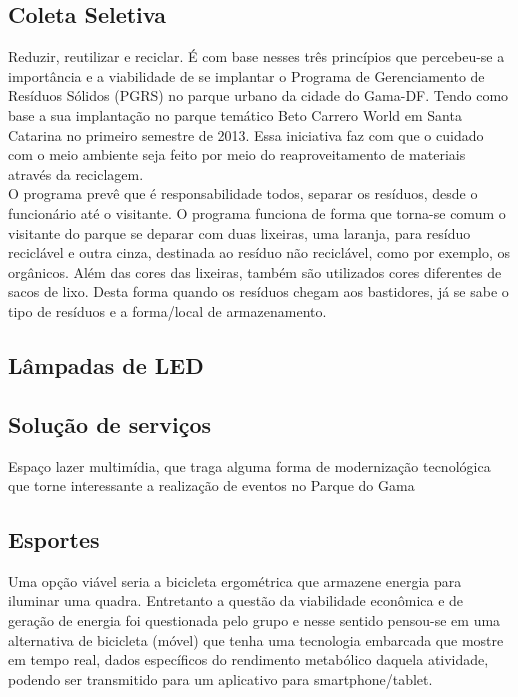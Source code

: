 \subsection{Coleta Seletiva}

Reduzir, reutilizar e reciclar. \'E com base nesses tr\^es princ\'ipios que percebeu-se a import\^ancia e a viabilidade de se implantar o Programa de Gerenciamento de Res\'iduos S\'olidos (PGRS) no parque urbano da cidade do Gama-DF. Tendo como base a sua implanta\c{c}\~ao no parque tem\'atico Beto Carrero World em Santa Catarina no primeiro semestre de 2013. Essa iniciativa faz com que o cuidado com o meio ambiente seja feito por meio do reaproveitamento de materiais atrav\'es da reciclagem. \\
O programa prev\^e que \'e responsabilidade todos, separar os res\'iduos, desde o funcion\'ario at\'e o visitante. O programa funciona de forma que torna-se comum o visitante do parque se deparar com duas lixeiras, uma laranja, para res\'iduo recicl\'avel e outra cinza, destinada ao res\'iduo n\~ao recicl\'avel, como por exemplo, os org\^anicos. Al\'em das cores das lixeiras, tamb\'em s\~ao utilizados cores diferentes de sacos de lixo. Desta forma quando os res\'iduos chegam aos bastidores, j\'a se sabe o tipo de res\'iduos e a forma/local de armazenamento.

\subsection{L\^ampadas de LED}

\subsection{Solu\c{c}\~ao de servi\c{c}os}

Espa\c{c}o lazer multim\'idia, que traga alguma forma de moderniza\c{c}\~ao tecnol\'ogica que torne interessante a realiza\c{c}\~ao de eventos no Parque do Gama

\subsection{Esportes}

Uma op\c{c}\~ao vi\'avel seria a bicicleta ergom\'etrica que armazene energia para iluminar uma quadra. Entretanto a quest\~ao da viabilidade econ\^omica e de gera\c{c}\~ao de energia foi questionada pelo grupo e nesse sentido pensou-se em uma alternativa de bicicleta (m\'ovel) que tenha uma tecnologia embarcada que mostre em tempo real, dados espec\'ificos do rendimento metab\'olico daquela atividade, podendo ser transmitido para um aplicativo para smartphone/tablet.

